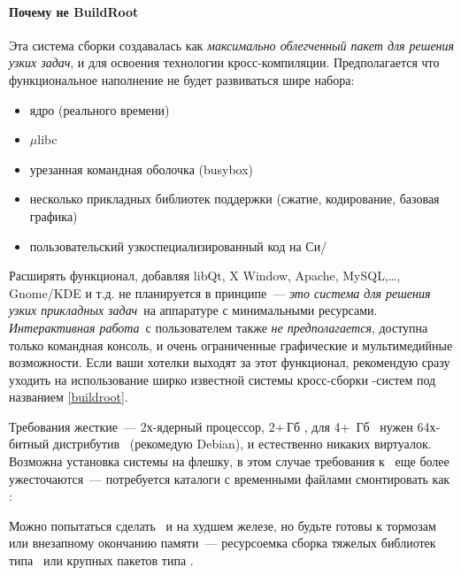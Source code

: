 \paragraph{Почему не BuildRoot}

Эта система сборки создавалась как \emph{максимально облегченный пакет
для решения узких задач}, и для освоения технологии кросс-компиляции.
Предполагается что функциональное наполнение не будет развиваться шире набора:

\begin{itemize}
  \item ядро (реального времени)
  \item $\mu$libc
  \item урезанная командная оболочка (busybox)
  \item несколько прикладных библиотек поддержки (сжатие, кодирование, базовая
  графика)
  \item пользовательский узкоспециализированный код на Си/\cpp
\end{itemize}

Расширять функционал, добавляя libQt, X Window, Apache, MySQL,\ldots, Gnome/KDE
и т.д. не планируется в принципе\ --- \emph{это система для решения узких
прикладных задач}\ на аппаратуре с минимальными ресурсами. \emph{Интерактивная работа}\ с пользователем также
\emph{не предполагается}, доступна только командная консоль, и очень ограниченные графические и мультимедийные
возможности. Если ваши хотелки выходят за этот функционал, рекомендую сразу
уходить на использование ширко известной системы кросс-сборки \linux-систем под
названием \ref{buildroot}.


Требования жесткие\ --- 2х-ядерный процессор, 2+\,Гб \ram, для 4+\, Гб \ram\
нужен 64х-битный дистрибутив \linux\ (рекомедую Debian), и естественно никаких
виртуалок.
Возможна установка системы на флешку, в этом случае требования к \ram\ еще более
ужесточаются\ --- потребуется каталоги с временными файлами смонтировать как
\file{tmpfs}:


Можно попытаться сделать \ и на худшем железе, но будьте
готовы к тормозам или внезапному окончанию памяти\ --- ресурсоемка сборка
тяжелых библиотек типа \pack{libQt}\ или крупных пакетов типа \pack{gcc}.

